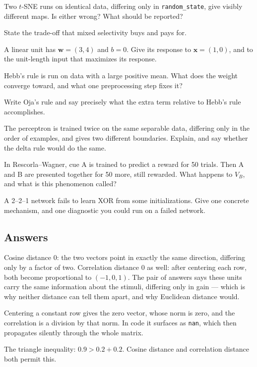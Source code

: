 \documentclass[11pt]{article}
\begin{document}
 Two $t$-SNE runs on identical data, differing only in
\texttt{random\_state}, give visibly different maps. Is either wrong? What
should be reported?

 State the trade-off that mixed selectivity buys and pays for.

 A linear unit has $\boldsymbol{w} = (3, 4)$ and $b = 0$. Give its
response to $\boldsymbol{x} = (1, 0)$, and to the unit-length input that
maximizes its response.

 Hebb's rule is run on data with a large positive mean. What does the
weight converge toward, and what one preprocessing step fixes it?

 Write Oja's rule and say precisely what the extra term relative to
Hebb's rule accomplishes.

 The perceptron is trained twice on the same separable data, differing
only in the order of examples, and gives two different boundaries. Explain, and
say whether the delta rule would do the same.

 In Rescorla--Wagner, cue A is trained to predict a reward for 50
trials. Then A and B are presented together for 50 more, still rewarded. What
happens to $V_B$, and what is this phenomenon called?

 A 2--2--1 network fails to learn XOR from some initializations. Give
one concrete mechanism, and one diagnostic you could run on a failed network.

\subsection*{Answers}

 Cosine distance $0$: the two vectors point in exactly the same
direction, differing only by a factor of two. Correlation distance $0$ as well:
after centering each row, both become proportional to $(-1, 0, 1)$. The pair of
answers says these units carry the same information about the stimuli, differing
only in gain --- which is why neither distance can tell them apart, and why
Euclidean distance would.

 Centering a constant row gives the zero vector, whose norm is zero, and
the correlation is a division by that norm. In code it surfaces as \texttt{nan},
which then propagates silently through the whole matrix.

 The triangle inequality: $0.9 > 0.2 + 0.2$. Cosine distance and
correlation distance both permit this.
\end{document}
